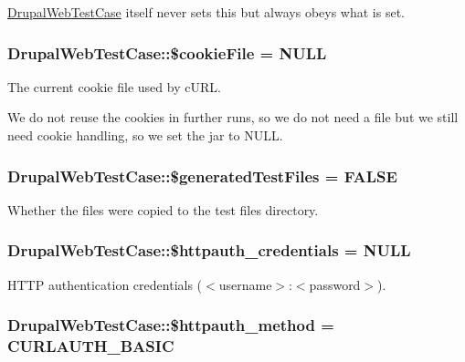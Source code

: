 \hyperlink{classDrupalWebTestCase}{DrupalWebTestCase} itself never sets this but always obeys what is set. \hypertarget{classDrupalWebTestCase_abee07354ff94d9b036c7b2e1b1855176}{
\subsubsection[{\$cookieFile}]{\setlength{\rightskip}{0pt plus 5cm}DrupalWebTestCase::\$cookieFile = NULL}}
\label{classDrupalWebTestCase_abee07354ff94d9b036c7b2e1b1855176}
The current cookie file used by cURL.

We do not reuse the cookies in further runs, so we do not need a file but we still need cookie handling, so we set the jar to NULL. \hypertarget{classDrupalWebTestCase_ad7465c96d4458e825ce9ff381a88acae}{
\subsubsection[{\$generatedTestFiles}]{\setlength{\rightskip}{0pt plus 5cm}DrupalWebTestCase::\$generatedTestFiles = FALSE}}
\label{classDrupalWebTestCase_ad7465c96d4458e825ce9ff381a88acae}
Whether the files were copied to the test files directory. \hypertarget{classDrupalWebTestCase_a1d8ed55611dfba216fc9a7eaaca59b8d}{
\subsubsection[{\$httpauth\_\-credentials}]{\setlength{\rightskip}{0pt plus 5cm}DrupalWebTestCase::\$httpauth\_\-credentials = NULL}}
\label{classDrupalWebTestCase_a1d8ed55611dfba216fc9a7eaaca59b8d}
HTTP authentication credentials ($<$username$>$:$<$password$>$). \hypertarget{classDrupalWebTestCase_a809845c0dd606b1e0511eb52ff8450da}{
\subsubsection[{\$httpauth\_\-method}]{\setlength{\rightskip}{0pt plus 5cm}DrupalWebTestCase::\$httpauth\_\-method = CURLAUTH\_\-BASIC}}
